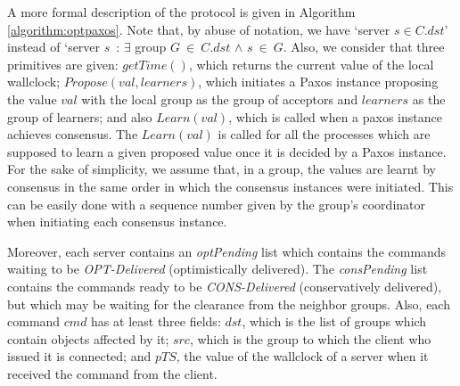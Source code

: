 \documentclass[times, 10pt]{article}
\begin{document}
A more formal description of the protocol is given in Algorithm \ref{algorithm:optpaxos}. Note that, by abuse of notation, we have `server $s \in C.dst$' instead of `server $s$~: $\exists$ group $G~\in~C.dst$ $\wedge$ $s~\in~G$. Also, we consider that three primitives are given: $getTime()$, which returns the current value of the local wallclock; $Propose(val, learners)$, which initiates a Paxos \cite{paxosref} instance proposing the value $val$ with the local group as the group of acceptors and $learners$ as the group of learners; and also $Learn(val)$, which is called when a paxos instance achieves consensus. The $Learn(val)$ is called for all the processes which are supposed to learn a given proposed value once it is decided by a Paxos instance. For the sake of simplicity, we assume that, in a group, the values are learnt by consensus in the same order in which the consensus instances were initiated. This can be easily done with a sequence number given by the group's coordinator when initiating each consensus instance.

Moreover, each server contains an \textit{optPending} list which contains the commands waiting to be \textit{OPT-Delivered} (optimistically delivered). The \mbox{\textit{consPending}} list contains the commands ready to be \textit{CONS-Delivered} (conservatively delivered), but which may be waiting for the clearance from the neighbor groups. Also, each command $cmd$ has at least three fields: $dst$, which is the list of groups which contain objects affected by it; $src$, which is the group to which the client who issued it is connected; and $pTS$, the value of the wallclock of a server when it received the command from the client.
\end{document}
